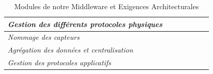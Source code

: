 \begin{table}[h!]
\begin{tabular}{|l|l|l|l|l|l|l|}
		\textit{Gestion des différents protocoles physiques} &                                                                                       & \checkmark                &                                                                            & \checkmark            &                                                                   &                    \\ \hline
		\textit{Nommage des capteurs}                        &                                                                                       & \checkmark                &                                                                            & \checkmark            &                                                                   &                    \\ \hline
		\textit{Agrégation des données et centralisation}    &                                                                                       & \checkmark                &                                                                            & \checkmark            & \checkmark                                                        &                    \\ \hline
		\textit{Gestion des protocoles applicatifs}          &                                                                                       & \checkmark                &                                                                            & \checkmark            &                                                                   &                    \\ \hline
	\end{tabular}
	\caption{Modules de notre Middleware et Exigences Architecturales}
\end{table}
